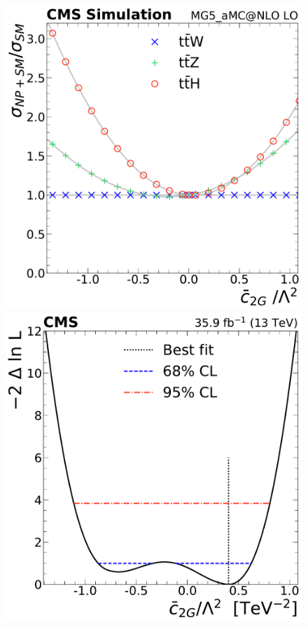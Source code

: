 \begin{landscape}
\begin{figure}
{        \includegraphics[height=\textheight]{figures/thirteen-TeV/NP/mu/c2G}\hspace{1cm}
        \includegraphics[height=\textheight]{figures/thirteen-TeV/NP/nll/c2G}\hspace{1cm}
}
\end{figure}
\end{landscape}
